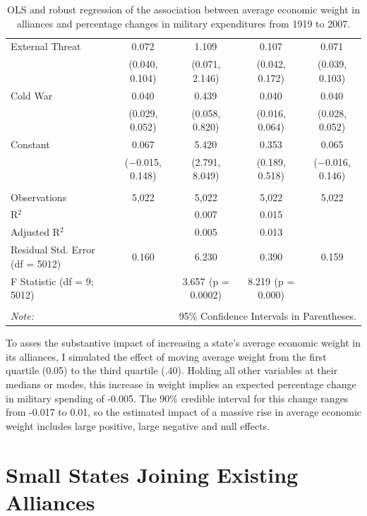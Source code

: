 \documentclass[12pt]{article}
\begin{document}
\begin{table}[!htbp]
\begin{adjustbox}{width= .95\textwidth, center}
\begin{tabular}{@{\extracolsep{0pt}}lcccc}
  External Threat & 0.072$^{}$ & 1.109$^{}$ & 0.107$^{}$ & 0.071$^{}$ \\ 
  & (0.040, 0.104) & (0.071, 2.146) & (0.042, 0.172) & (0.039, 0.103) \\ 
  Cold War & 0.040$^{}$ & 0.439$^{}$ & 0.040$^{}$ & 0.040$^{}$ \\ 
  & (0.029, 0.052) & (0.058, 0.820) & (0.016, 0.064) & (0.028, 0.052) \\ 
  Constant & 0.067 & 5.420$^{}$ & 0.353$^{}$ & 0.065 \\ 
  & ($-$0.015, 0.148) & (2.791, 8.049) & (0.189, 0.518) & ($-$0.016, 0.146) \\ 
 \hline \\[-1.8ex] 
Observations & 5,022 & 5,022 & 5,022 & 5,022 \\ 
R$^{2}$ &  & 0.007 & 0.015 &  \\ 
Adjusted R$^{2}$ &  & 0.005 & 0.013 &  \\ 
Residual Std. Error (df = 5012) & 0.160 & 6.230 & 0.390 & 0.159 \\ 
F Statistic (df = 9; 5012) &  & 3.657$^{}$  (p = 0.0002) & 8.219$^{}$  (p = 0.000) &  \\ 
\hline 
\hline \\[-1.8ex] 
\textit{Note:}  & \multicolumn{4}{r}{95\% Confidence Intervals in Parentheses.} \\ 
\end{tabular} 
\end{adjustbox}
  \caption{OLS and robust regression of the association between average economic weight in alliances
and percentage changes in military expenditures from 1919 to 2007.} 
  \label{tab:avg-weight-res} 
\end{table} 


To asses the substantive impact of increasing a state's average economic weight in its alliances, I simulated the effect of moving average weight from the first quartile (0.05) to the third quartile (.40). 
Holding all other variables at their medians or modes, this increase in weight implies an expected percentage change in military spending of -0.005. 
The 90\% credible interval for this change ranges from -0.017 to 0.01, so the estimated impact of a massive rise in average economic weight includes large positive, large negative and null effects. 


\section{Small States Joining Existing Alliances} 
\end{document}
